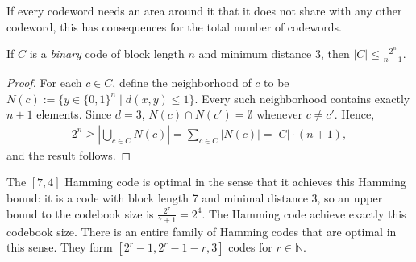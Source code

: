 \begin{center}
\def\scale{0.75}
\end{center}
If every codeword needs an area around it that it does not share with any other codeword, this has consequences for the total number of codewords.
\begin{proposition}
If $C$ is a \emph{binary} code of block length $n$ and minimum distance 3, then $|C| \leq \frac{2^n}{n+1}$.
\end{proposition}
\begin{proof}
For each $c \in C$, define the neighborhood of $c$ to be $N(c) := \{y \in \{0,1\}^n \mid d(x,y) \leq 1\}$. Every such neighborhood contains exactly $n+1$ elements. Since $d = 3$, $N(c) \cap N(c') = \emptyset$ whenever $c \neq c'$. Hence,
\begin{align}
2^n \geq |\bigcup_{c \in C} N(c)| = \sum_{c \in C} |N(c)| = |C| \cdot (n+1),
\end{align}
and the result follows.
\end{proof}
The $[7,4]$ Hamming code is optimal in the sense that it achieves this Hamming bound: it is a code with block length 7 and minimal distance 3, so an upper bound to the codebook size is $\frac{2^7}{7+1} = 2^4$. The Hamming code achieve exactly this codebook size. There is an entire family of Hamming codes that are optimal in this sense. They form $[2^r-1,2^r-1-r,3]$ codes for $r \in \mathbb{N}$.


